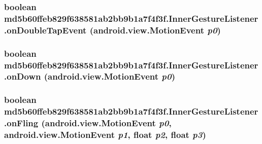 \hypertarget{classmd5b60ffeb829f638581ab2bb9b1a7f4f3f_1_1_inner_gesture_listener_4fb3a871dc13a6a2394ece055ec3ca5e}{
\subsubsection[{onDoubleTapEvent}]{\setlength{\rightskip}{0pt plus 5cm}boolean md5b60ffeb829f638581ab2bb9b1a7f4f3f.InnerGestureListener.onDoubleTapEvent (android.view.MotionEvent {\em p0})}}
\label{classmd5b60ffeb829f638581ab2bb9b1a7f4f3f_1_1_inner_gesture_listener_4fb3a871dc13a6a2394ece055ec3ca5e}


\hypertarget{classmd5b60ffeb829f638581ab2bb9b1a7f4f3f_1_1_inner_gesture_listener_040c94c7721114d95025411a4eed94ff}{
\subsubsection[{onDown}]{\setlength{\rightskip}{0pt plus 5cm}boolean md5b60ffeb829f638581ab2bb9b1a7f4f3f.InnerGestureListener.onDown (android.view.MotionEvent {\em p0})}}
\label{classmd5b60ffeb829f638581ab2bb9b1a7f4f3f_1_1_inner_gesture_listener_040c94c7721114d95025411a4eed94ff}


\hypertarget{classmd5b60ffeb829f638581ab2bb9b1a7f4f3f_1_1_inner_gesture_listener_1756e2693a60f1d3742380e89f01051f}{
\subsubsection[{onFling}]{\setlength{\rightskip}{0pt plus 5cm}boolean md5b60ffeb829f638581ab2bb9b1a7f4f3f.InnerGestureListener.onFling (android.view.MotionEvent {\em p0}, \/  android.view.MotionEvent {\em p1}, \/  float {\em p2}, \/  float {\em p3})}}
\label{classmd5b60ffeb829f638581ab2bb9b1a7f4f3f_1_1_inner_gesture_listener_1756e2693a60f1d3742380e89f01051f}


